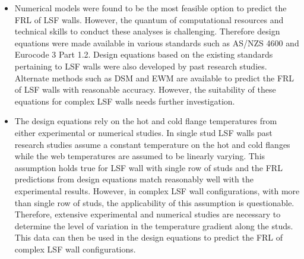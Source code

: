 \begin{itemize}
	\item Numerical models were found to be the most feasible option to predict the FRL of LSF walls. However, the quantum of computational resources and technical skills to conduct these analyses is challenging. Therefore design equations were made available in various standards such as AS/NZS 4600 and Eurocode 3 Part 1.2. Design equations based on the existing standards pertaining to LSF walls were also developed by past research studies. Alternate methods such as DSM and EWM are available to predict the FRL of LSF walls with reasonable accuracy. However, the suitability of these equations for complex LSF walls needs further investigation.
	\item The design equations rely on the hot and cold flange temperatures from either experimental or numerical studies. In single stud LSF walls past research studies assume a constant temperature on the hot and cold flanges while the web temperatures are assumed to be linearly varying. This assumption holds true for LSF wall with single row of studs and the FRL predictions from design equations match reasonably well with the experimental results. However, in complex LSF wall configurations, with more than single row of studs, the applicability of this assumption is questionable. Therefore, extensive experimental and numerical studies are necessary to determine the level of variation in the temperature gradient along the studs. This data can then be used in the design equations to predict the FRL of complex LSF wall configurations.  
\end{itemize}